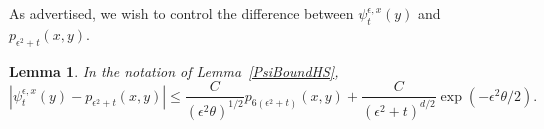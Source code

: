 \documentclass[12pt]{article}
\newtheorem{lemma}[theorem]{Lemma}
\newcommand{\IP}{\mathbb P}
\numberwithin{equation}{section}
\begin{document}
As advertised, we wish to control the difference between
$\psi_t^{\epsilon,x}(y)$
and $p_{\epsilon^2 + t}(x, y)$.

\begin{lemma}
    \label{Lemma:BoundPsiHS2}
    In the notation of Lemma~\ref{PsiBoundHS},
	\begin{equation}
\label{heat kernel estimate}
        \left|
            \psi_t^{\epsilon, x}(y)
            -
            p_{\epsilon^2 + t}(x, y)
        \right|
\le
        \frac{C}{(\epsilon^2 \theta)^{1/2}}
        p_{6(\epsilon^2+t)}(x, y)
        +
	    \frac{C}{(\epsilon^2 + t)^{d/2}}
	    \exp(- \epsilon^2 \theta / 2)
	    .
	\end{equation}
\end{lemma}
\end{document}

